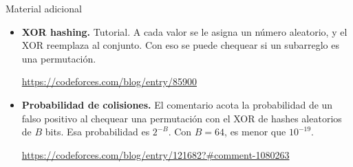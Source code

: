 \begin{frame}[fragile]{Material adicional}
  \begin{itemize}
    \item \textbf{XOR hashing.}
      Tutorial.
      A cada valor se le asigna un número aleatorio, y el XOR reemplaza al conjunto.
      Con eso se puede chequear si un subarreglo es una permutación.

      {\footnotesize \url{https://codeforces.com/blog/entry/85900}}

    \item \textbf{Probabilidad de colisiones.}
      El comentario acota la probabilidad de un falso positivo al chequear una permutación con el XOR de hashes aleatorios de \(B\) bits.
      Esa probabilidad es \(2^{-B}\).
      Con \(B = 64\), es menor que \(10^{-19}\).

      {\footnotesize \url{https://codeforces.com/blog/entry/121682?#comment-1080263}}
  \end{itemize}
\end{frame}

